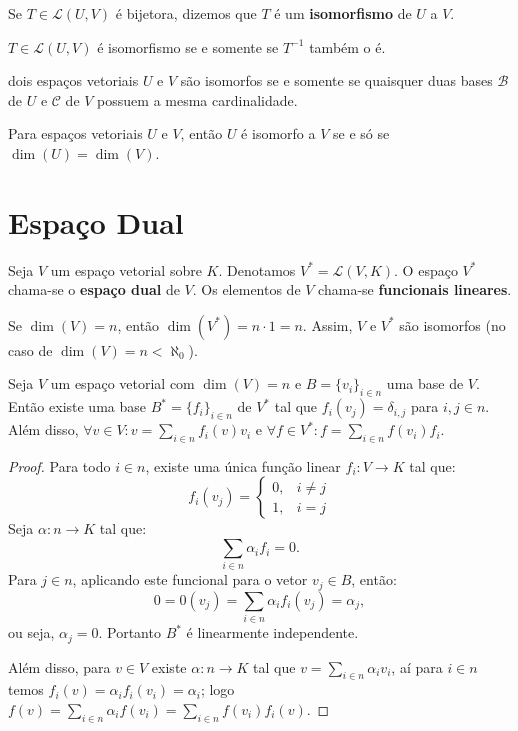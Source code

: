 \documentclass[11pt,twoside,a4paper]{book}
\begin{document}
\begin{definicao}
Se $T\in\mathcal{L}(U,V)$ é bijetora, dizemos que $T$ é um \textbf{isomorfismo} de $U$ a $V$.
\end{definicao}
\begin{proposicao}
$T \in \mathcal{L}(U,V)$ é isomorfismo se e somente se $T^{-1}$ também o é.
\end{proposicao}

\begin{proposicao}
dois espaços vetoriais $U$ e $V$ são isomorfos se e somente se quaisquer duas bases $\mathcal{B}$ de $U$ e $\mathcal{C}$ de $V$ possuem a mesma cardinalidade.
\end{proposicao}
\begin{teorema}
Para espaços vetoriais $U$ e $V$, então $U$ é isomorfo a $V$ se e só se $\dim(U)=\dim(V)$.
\end{teorema}

\section{Espaço Dual}

\begin{definicao}
Seja $V$ um espaço vetorial sobre $K$. Denotamos $V^*=\mathcal{L}(V,K)$. O espaço $V^*$ chama-se o \textbf{espaço dual} de $V$. Os elementos de $V$ chama-se \textbf{funcionais lineares}.
\end{definicao}

\medskip
\noindent
Se $\dim(V)=n$, então $\dim(V^*)=n\cdot 1=n$. Assim, $V$ e $V^*$ são isomorfos (no caso de $\dim(V)=n<\aleph_0$).

\begin{teorema}
Seja $V$ um espaço vetorial com $\dim(V)=n$ e $B=\{v_i\}_{i\in n}$ uma base de $V$. Então existe uma base $B^*=\{f_i\}_{i\in n}$ de $V^*$ tal que $f_i(v_j)=\delta_{i,j}$ para $i,j\in n$. Além disso, $\forall v\in V:v=\sum_{i\in n}f_i(v)v_i$ e $\forall f\in V^*:f=\sum_{i\in n}f(v_i)f_i$.
\end{teorema}
\begin{proof}
Para todo $i\in n$, existe uma única função linear $f_i:V\rightarrow K$ tal que:
\[
f_i(v_j)=\left\{\begin{array}{rl}0,&i\neq j\\1,&i=j\end{array}\right.
\]
Seja $\alpha:n\rightarrow K$ tal que:
\[
\sum_{i\in n}\alpha_if_i=0.
\]
Para $j\in n$, aplicando este funcional para o vetor $v_j\in B$, então:
\[
0=0(v_j)=\sum_{i\in n}\alpha_if_i(v_j)=\alpha_j,
\]
ou seja, $\alpha_j=0$. Portanto $B^*$ é linearmente independente.

\medskip
\noindent
Além disso, para $v\in V$ existe $\alpha:n\rightarrow K$ tal que $v=\sum_{i\in n}\alpha_iv_i$, aí para $i\in n$ temos $f_i(v)=\alpha_if_i(v_i)=\alpha_i$; logo $f(v)=\sum_{i\in n}\alpha_if(v_i)=\sum_{i\in n}f(v_i)f_i(v)$. 
\end{proof}
\end{document}
